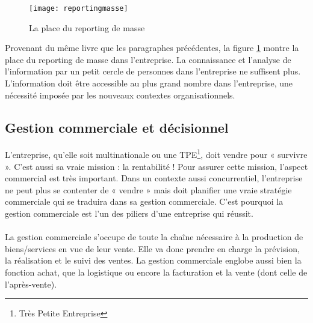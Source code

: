 \begin{figure}[H]
    \centering
    \texttt{[image: reportingmasse]}
    \caption{La place du reporting de masse}
    \label{fig:reportingmasse}
\end{figure}
 Provenant du même livre que les paragraphes précédentes, la figure \ref{fig:reportingmasse} montre la place du reporting de masse dans l'entreprise. La connaissance et l'analyse de l'information par un petit cercle de personnes dans l'entreprise ne suffisent plus. L'information doit être accessible au plus grand nombre dans l'entreprise, une nécessité imposée par les nouveaux contextes organisationnels.









\subsection{Gestion commerciale et décisionnel}
L’entreprise, qu’elle soit multinationale ou une TPE\footnote{Très Petite Entreprise}, doit vendre pour « survivre ». C’est aussi sa vraie mission : la rentabilité ! Pour assurer cette mission, l’aspect commercial est très important. Dans un contexte aussi concurrentiel, l’entreprise ne peut plus se contenter de « vendre » mais doit planifier une vraie stratégie commerciale qui se traduira dans sa gestion commerciale. C’est pourquoi la gestion commerciale est l’un des piliers d’une entreprise qui réussit.
\paragraph{}
La gestion commerciale s’occupe de toute la chaîne nécessaire à la production de biens/services en vue de leur vente. Elle va donc prendre en charge la prévision, la réalisation et le suivi des ventes. La gestion commerciale englobe aussi bien la fonction achat, que la logistique ou encore la facturation et la vente (dont celle de l’après-vente). 

